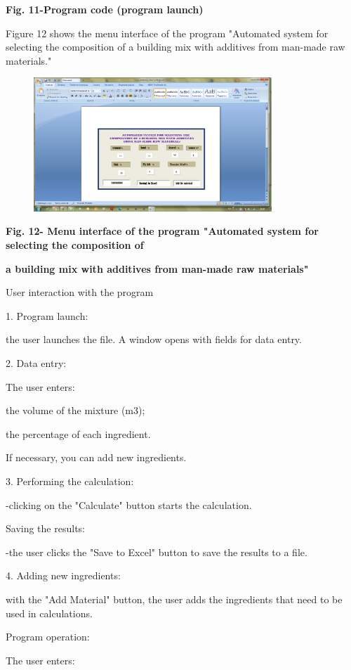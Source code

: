 {{\bfseries Fig. 11-Program code (program launch)}

Figure 12 shows the menu interface of the program "Automated system for
selecting the composition of a building mix with additives from man-made
raw materials."

\begin{figure}[H]
	\centering
	\includegraphics[width=0.8\textwidth]{media/ict3/image13}
	\caption*{}
\end{figure}


{\bfseries Fig. 12- Menu interface of the program "Automated system for
selecting the composition of}

{\bfseries a building mix with additives from man-made raw materials"}

User interaction with the program

1. Program launch:

the user launches the file. A window opens with fields for data entry.

2. Data entry:

The user enters:

the volume of the mixture (m3);

the percentage of each ingredient.

If necessary, you can add new ingredients.

3. Performing the calculation:

-clicking on the "Calculate" button starts the calculation.

Saving the results:

-the user clicks the "Save to Excel" button to save the results to a
file.

4. Adding new ingredients:

with the "Add Material" button, the user adds the ingredients that need
to be used in calculations.

Program operation:

The user enters:

}
